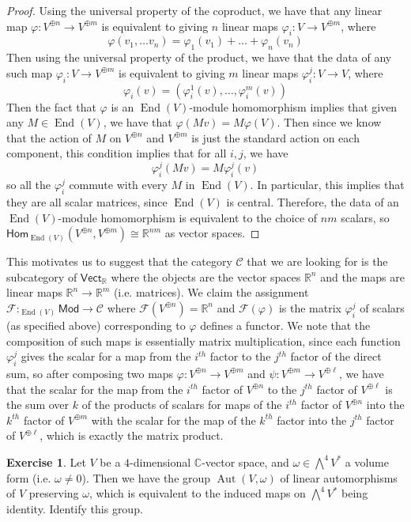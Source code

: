 \documentclass[psamsfonts]{amsart}
\theoremstyle{definition}
\newtheorem{exer}[thm]{Exercise}
\theoremstyle{remark}
\renewcommand{\hom}{\mathsf{Hom}}
\newcommand{\R}{\mathbb{R}}
\newcommand{\C}{\mathbb{C}}
\DeclareMathOperator{\Aut}{Aut}
\DeclareMathOperator{\End}{End}
\begin{document}
\begin{proof}
Using the universal property of the coproduct, we have that any linear map $\varphi : V^{\oplus n} \to V^{\oplus m}$ is equivalent to giving $n$ linear maps $\varphi_i : V \to V^{\oplus m}$, where
$$\varphi(v_1, \ldots v_n) = \varphi_1(v_1) + \ldots + \varphi_n(v_n) $$
Then using the universal property of the product, we have that the data of any such map $\varphi_i : V \to V^{\oplus m}$ is equivalent to giving $m$ linear maps $\varphi_i^j : V \to V$, where
$$\varphi_i(v) = (\varphi_i^1(v), \ldots , \varphi_i^m(v)) $$
Then the fact that $\varphi$ is an $\End(V)$-module homomorphism implies that given any $M \in \End(V)$, we have that $\varphi(Mv) = M\varphi(V)$. Then since we know that the action of $M$ on $V^{\oplus n}$ and $V^{\oplus m}$ is just the standard action on each component, this condition implies that for all $i,j$, we have 
$$\varphi^j_i(Mv) = M \varphi_i^j(v)$$
so all the $\varphi^j_i$ commute with every $M$ in $\End(V)$. In particular, this implies that they are all scalar matrices, since $\End(V)$ is central. Therefore, the data of an $\End(V)$-module homomorphism is equivalent to the choice of $nm$ scalars, so $\hom_{\End(V)}(V^{\oplus n}, V^{\oplus m}) \cong \R^{nm}$ as vector spaces.
\end{proof}
This motivates us to suggest that the category $\mathscr{C}$ that we are looking for is the subcategory of $\mathsf{Vect}_\R$ where the objects are the vector spaces $\R^n$ and the maps are linear maps $\R^n \to \R^m$ (i.e. matrices). We claim the assignment $\mathcal{F} : _{\End(V)}\mathsf{Mod} \to \mathscr{C}$ where $\mathcal{F}(V^{\oplus n}) = \R^n$ and $\mathcal{F}(\varphi)$ is the matrix $\varphi_i^j$ of scalars (as specified above) corresponding to $\varphi$ defines a functor. We note that the composition of such maps is essentially matrix multiplication, since each function $\varphi_i^j$ gives the scalar for a map from the $i^{th}$ factor to the $j^{th}$ factor of the direct sum, so after composing two maps $\varphi : V^{\oplus n} \to V^{\oplus m}$ and $\psi : V^{\oplus m} \to V^{\oplus \ell}$, we have that the scalar for the map from the $i^{th}$ factor of $V^{\oplus n}$ to the $j^{th}$ factor of $V^{\oplus \ell}$ is the sum over $k$ of the products of scalars for maps of the $i^{th}$ factor of $V^{\oplus n}$ into the $k^{th}$ factor of $V^{\oplus m}$ with the scalar for the map of the $k^{th}$ factor into the $j^{th}$ factor of $V^{\oplus \ell}$, which is exactly the matrix product.
%
\begin{exer}
Let $V$ be a $4$-dimensional $\C$-vector space, and $\omega \in \bigwedge^4 V^*$ a volume form (i.e. $\omega \neq 0$). Then we have the group $\Aut(V,\omega)$ of linear automorphisms of $V$ preserving $\omega$, which is equivalent to the induced maps on $\bigwedge^4V^*$ being identity. Identify this group.
\end{exer}
\end{document}
